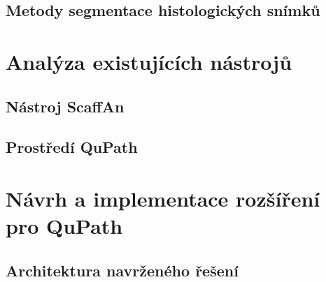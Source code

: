 \documentclass[czech, bc, kky, he, iso690alph, pdf]{fasthesis}
\begin{document}
\section{Metody segmentace histologických snímků}

%
\chapter{Analýza existujících nástrojů}

\section{Nástroj ScaffAn}

\section{Prostředí QuPath}

%
\chapter{Návrh a implementace rozšíření pro QuPath}

\section{Architektura navrženého řešení}
\end{document}
